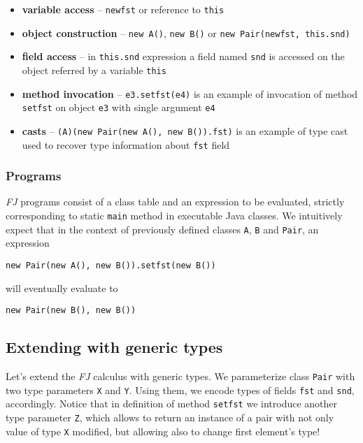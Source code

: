 \documentclass{article}[12pt]
\begin{document}
\begin{itemize}
\item{\textbf{variable access}} -- \texttt{newfst} or reference to
  \texttt{this}
\item{\textbf{object construction}} -- \texttt{new A()},
  \texttt{new B()} or \texttt{new Pair(newfst, this.snd)}
\item{\textbf{field access}} -- in \texttt{this.snd} expression 
  a field named \texttt{snd} is accessed on the object referred by
  a variable \texttt{this}
\item{\textbf{method invocation}} -- \texttt{e3.setfst(e4)}
  is an example of invocation of method \texttt{setfst} on object
  \texttt{e3} with single argument \texttt{e4}
\item{\textbf{casts}} -- \texttt{(A)(new Pair(new A(), new B()).fst)}
  is an example of type cast used to recover type information about
  \texttt{fst} field
\end{itemize}

\subsubsection{Programs}

\emph{FJ} programs consist of a class table and an expression
to be evaluated, strictly corresponding to static \texttt{main} method in
executable Java classes. We intuitively expect that in the context
of previously defined classes \texttt{A}, \texttt{B} and \texttt{Pair},
an expression

\begin{verbatim}
new Pair(new A(), new B()).setfst(new B())
\end{verbatim}
will eventually evaluate to
\begin{verbatim}
new Pair(new B(), new B())
\end{verbatim}


\subsection{Extending with generic types}

Let's extend the \emph{FJ} calculus with generic types. We parameterize
class \texttt{Pair} with two type parameters \texttt{X} and \texttt{Y}.
Using them, we encode types of fields \texttt{fst} and \texttt{snd},
accordingly. Notice that in definition of method \texttt{setfst} we
introduce another type parameter \texttt{Z}, which allows to return
an instance of a pair with not only value of type \texttt{X} modified,
but allowing also to change first element's type!
\end{document}
